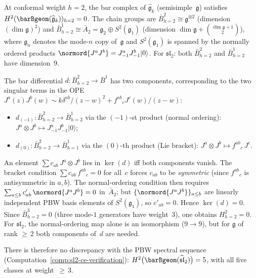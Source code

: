 \begin{lemma}\label{lem:bar-deg2-symmetric-square}
At conformal weight $h = 2$, the bar complex of
$\widehat{\mathfrak{g}}_k$ (semisimple~$\mathfrak{g}$) satisfies
$H^2(\barBgeom(\widehat{\mathfrak{g}}_k))_{h=2} = 0$.
The chain groups are $\bar{B}^2_{h=2} \cong \mathfrak{g}^{\otimes 2}$
(dimension~$(\dim\mathfrak{g})^2$) and
$\bar{B}^1_{h=2} \cong \bar{A}_2 = \mathfrak{g}_2 \oplus S^2(\mathfrak{g}_1)$
(dimension $\dim\mathfrak{g} + \binom{\dim\mathfrak{g}+1}{2}$),
where $\mathfrak{g}_n$ denotes the mode-$n$ copy of~$\mathfrak{g}$
and $S^2(\mathfrak{g}_1)$ is spanned by the normally ordered products
$\normord{J^a J^b} = J^a_{-1}J^b_{-1}|0\rangle$.  For
$\mathfrak{sl}_2$: both $\bar{B}^2_{h=2}$ and $\bar{B}^1_{h=2}$
have dimension~$9$.

The bar differential $d \colon \bar{B}^2_{h=2} \to \bar{B}^1$
has two components, corresponding to the two singular terms in the
OPE $J^a(z)J^b(w) \sim k\delta^{ab}/(z-w)^2 + f^{ab}{}_c
J^c(w)/(z-w)$:
\begin{itemize}
\item $d_{(-1)} \colon \bar{B}^2_{h=2} \to \bar{B}^1_{h=2}$
  via the $(-1)$-st product (normal ordering):
  $J^a \otimes J^b \mapsto J^a_{-1}J^b_{-1}|0\rangle$;

\item $d_{(0)} \colon \bar{B}^2_{h=2} \to \bar{B}^1_{h=1}$
  via the $(0)$-th product (Lie bracket):
  $J^a \otimes J^b \mapsto f^{ab}{}_c\, J^c$.
\end{itemize}

An element $\sum c_{ab}\, J^a \otimes J^b$ lies in $\ker(d)$ iff
both components vanish.  The bracket condition
$\sum c_{ab}\, f^{ab}{}_c = 0$ for all~$c$ forces $c_{ab}$
to be \emph{symmetric} (since $f^{ab}{}_c$ is antisymmetric in
$a,b$).  The normal-ordering condition then requires
$\sum_{a \leq b} c'_{ab}\, \normord{J^a J^b} = 0$
in~$\bar{A}_2$; but $\{\normord{J^a J^b}\}_{a \leq b}$ are
linearly independent PBW basis elements of
$S^2(\mathfrak{g}_1)$, so $c'_{ab} = 0$.
Hence $\ker(d) = 0$.  Since $\bar{B}^3_{h=2} = 0$ (three
mode-$1$ generators have weight~$3$), one obtains $H^2_{h=2} = 0$.
For $\mathfrak{sl}_2$, the normal-ordering map alone is an
isomorphism ($9 \to 9$), but for $\mathfrak{g}$ of rank
${\geq}\, 2$ both components of~$d$ are needed.

There is therefore no discrepancy with the PBW spectral sequence
(Computation~\ref{comp:sl2-ce-verification}):
$H^2\bigl(\barBgeom(\widehat{\mathfrak{sl}}_2)\bigr) = 5$,
with all five classes at weight~${\geq}\, 3$.
\end{lemma}

